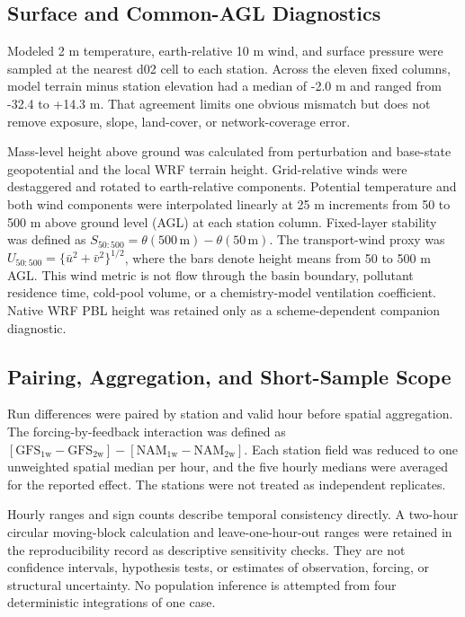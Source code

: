 \documentclass[air,article,submit,moreauthors]{Definitions/mdpi}
\begin{document}
\subsection{Surface and Common-AGL Diagnostics}

Modeled 2 m temperature, earth-relative 10 m wind, and surface pressure were sampled at the nearest d02 cell to each station.
Across the eleven fixed columns, model terrain minus station elevation had a median of -2.0 m and ranged from -32.4 to +14.3 m.
That agreement limits one obvious mismatch but does not remove exposure, slope, land-cover, or network-coverage error.

Mass-level height above ground was calculated from perturbation and base-state geopotential and the local WRF terrain height.
Grid-relative winds were destaggered and rotated to earth-relative components.
Potential temperature and both wind components were interpolated linearly at 25 m increments from 50 to 500 m above ground level (AGL) at each station column.
Fixed-layer stability was defined as $S_{50:500}=\theta(500\,\mathrm{m})-\theta(50\,\mathrm{m})$.
The transport-wind proxy was $U_{50:500}=\{\bar{u}^{2}+\bar{v}^{2}\}^{1/2}$, where the bars denote height means from 50 to 500 m AGL.
This wind metric is not flow through the basin boundary, pollutant residence time, cold-pool volume, or a chemistry-model ventilation coefficient.
Native WRF PBL height was retained only as a scheme-dependent companion diagnostic.

\subsection{Pairing, Aggregation, and Short-Sample Scope}

Run differences were paired by station and valid hour before spatial aggregation.
The forcing-by-feedback interaction was defined as
$[\mathrm{GFS}_{1\mathrm{w}}-\mathrm{GFS}_{2\mathrm{w}}]-[\mathrm{NAM}_{1\mathrm{w}}-\mathrm{NAM}_{2\mathrm{w}}]$.
Each station field was reduced to one unweighted spatial median per hour, and the five hourly medians were averaged for the reported effect.
The stations were not treated as independent replicates.

Hourly ranges and sign counts describe temporal consistency directly.
A two-hour circular moving-block calculation and leave-one-hour-out ranges were retained in the reproducibility record as descriptive sensitivity checks.
They are not confidence intervals, hypothesis tests, or estimates of observation, forcing, or structural uncertainty.
No population inference is attempted from four deterministic integrations of one case.
\end{document}
